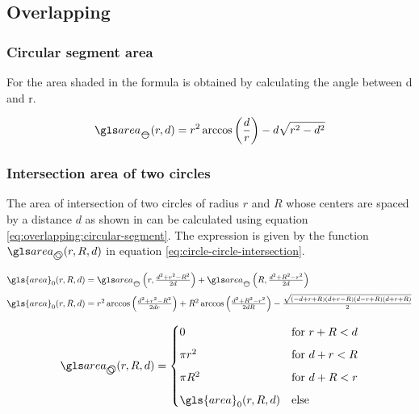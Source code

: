 \begin{appendix}
\subsection{Overlapping}\label{sec:overlapping}

\subsubsection{Circular segment area}


For the area shaded in  the formula is obtained by calculating the angle between d and r.

\begin{equation}\label{eq:overlapping:circular-segment}
\cirseg(r, d) = r^2 \arccos\left( \frac{d}{r} \right) - d \sqrt{r^2 - d^2}
\end{equation}

\subsubsection{Intersection area of two circles}\label{sec:circle-circle-intersection}

The area of intersection of two circles of radius \( r \) and \( R \) whose centers are spaced by a distance \( d \) as shown in  can be calculated using equation \eqref{eq:overlapping:circular-segment}. The expression is given by the function \( \circir (r, R, d) \) in equation \eqref{eq:circle-circle-intersection}.


\begin{align}
  \gls{area}_0 (r, R, d) & =
  \textstyle
  \cirseg \left(r, \frac{d^2 + r^2 - R^2}{2 d} \right) + \cirseg \left( R, \frac{d^2 + R^2 - r^2}{2 d} \right)
  \\[1mm]
  \gls{area}_0 (r, R, d) & =
  \textstyle
  r^2 \arccos \left( \frac{d^2 + r^2 - R^2}{2 d r} \right)
  + R^2 \arccos \left( \frac{d^2 + R^2 - r^2}{2 d R} \right)
  - \frac{\sqrt{(-d+r+R)(d+r-R)(d-r+R)(d+r+R)}}{2}
\end{align}

\begin{equation}\label{eq:circle-circle-intersection}
  \circir (r, R, d) =
  \begin{cases}
    0 & \text{for } r + R < d \\[2mm]
    \pi r^2 & \text{for } d + r < R \\[2mm]
    \pi R^2 & \text{for } d + R < r \\[2mm]
    \gls{area}_0 (r, R, d) & \text{else}
  \end{cases}
\end{equation}


\end{appendix}
